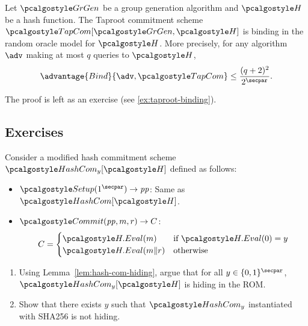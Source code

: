 \begin{lemma}\label{lem:taproot-binding}
  Let $\grgen$ be a group generation algorithm and $\algo{H}$ be a hash function.
  The Taproot commitment scheme $\algo{TapCom}[\grgen, \algo{H}]$ is binding in the random oracle model for $\algo{H}$.
  More precisely, for any algorithm $\adv$ making at most $q$ queries to $\algo{H}$,
  \[
  \advantage{Bind}{\adv, \algo{TapCom}} \leq \frac{(q+2)^2}{2^\secpar}.
  \]
\end{lemma}

The proof is left as an exercise (see \autoref{ex:taproot-binding}).

\subsection{Exercises}

\begin{exercise}\label{ex:rom-contrived-hashcom}
  Consider a modified hash commitment scheme $\algo{HashCom}_y[\algo{H}]$ defined as follows:
  \begin{itemize}
    \item $\algo{Setup}(1^\secpar) \rightarrow \params$: Same as $\algo{HashCom}[\algo{H}]$.
    \item $\algo{Commit}(\params, m, r) \rightarrow C$: 
    \begin{align*}
      C = \begin{cases}
        \algo{H.Eval}(m) & \text{if } \algo{H.Eval}(0) = y \\
        \algo{H.Eval}(m \| r) & \text{otherwise}
      \end{cases}
    \end{align*}
  \end{itemize}
  
  \begin{enumerate}
    \item Using Lemma~\ref{lem:hash-com-hiding}, argue that for all $y \in \{0,1\}^\secpar$, $\algo{HashCom}_y[\algo{H}]$ is hiding in the ROM.
    \item Show that there exists $y$ such that $\algo{HashCom}_y$ instantiated with SHA256 is not hiding.
  \end{enumerate}
\end{exercise}

